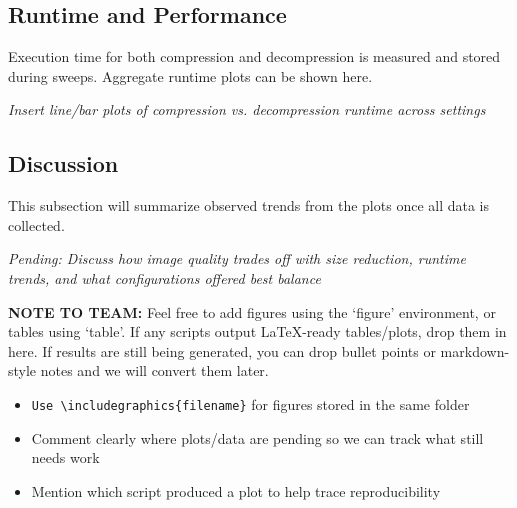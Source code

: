 \subsection{Runtime and Performance}
Execution time for both compression and decompression is measured and stored during sweeps. Aggregate runtime plots can be shown here.

\textit{Insert line/bar plots of compression vs. decompression runtime across settings}

\subsection{Discussion}
This subsection will summarize observed trends from the plots once all data is collected.

\textit{Pending: Discuss how image quality trades off with size reduction, runtime trends, and what configurations offered best balance}

\textbf{NOTE TO TEAM:} Feel free to add figures using the `figure' environment, or tables using `table'. If any scripts output LaTeX-ready tables/plots, drop them in here. If results are still being generated, you can drop bullet points or markdown-style notes and we will convert them later.

\begin{itemize}
    \item \texttt{Use \textbackslash includegraphics\{filename\}} for figures stored in the same folder
    \item Comment clearly where plots/data are pending so we can track what still needs work
    \item Mention which script produced a plot to help trace reproducibility
\end{itemize}